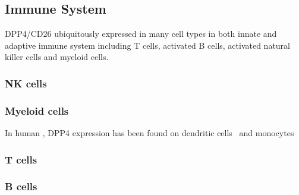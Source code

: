 \subsection{Immune System}
DPP4/CD26 ubiquitously expressed in many cell types in both innate and adaptive immune system including T cells, activated B cells, activated natural killer cells and myeloid cells.~\cite{Abbott1994,Shingu2003,Hong1989,Gutschmidt1981,Dikov2004,Bühling1995,Tanaka1992,Gorrell1991}  

\subsubsection{NK cells}

\subsubsection{Myeloid cells}
In human , DPP4 expression has been found on dendritic cells~\cite{Zhong2013,Gliddon2002,Epardaud2004} and monocytes

\subsubsection{T cells}
\subsubsection{B cells}
